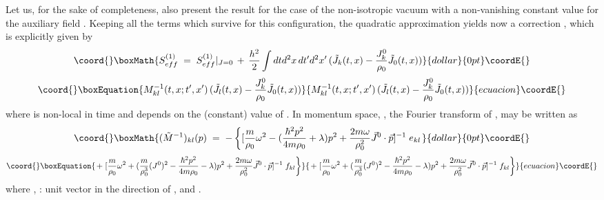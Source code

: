 \documentclass[a4paper,12pt]{article} \tolerance=200
\begin{document}
Let us, for the sake of completeness, also present the result for the
case of the non-isotropic vacuum with a non-vanishing constant value
\coordHE{} for the auxiliary field \coordHE{}. Keeping all the terms which
survive for this configuration, the quadratic approximation yields now
a correction \coordHE{}, which is explicitly given by
$$\coord{}\boxMath{
S^{(1)}_{eff}\;=\;  S^{(1)}_{eff}|_{J=0} \,+\, 
\frac{h^2}{2} \int dtd^2x \, dt'd^2x'\,
({\tilde J}_k(t,x) - \frac{J^0_k}{\rho_0} {\tilde J}_0(t,x))
}{dollar}{0pt}\coordE{}$$
\begin{equation}\coord{}\boxEquation{\label{eq:s4eff}
M^{-1}_{kl}(t,x;t',x')\,({\tilde J}_l(t,x) - \frac{J^0_k}{\rho_0} {\tilde J}_0(t,x))
}{M^{-1}_{kl}(t,x;t',x')\,({\tilde J}_l(t,x) - \frac{J^0_k}{\rho_0} {\tilde J}_0(t,x))
}{ecuacion}\coordE{}\end{equation}
where \coordHE{} is non-local in time and depends on the (constant)
value of \coordHE{}.  In momentum space, \coordHE{}, the Fourier
transform of \coordHE{}, may be written as
$$\coord{}\boxMath{
({\tilde M}^{-1})_{kl} (p) \;=\; - \left\{ [ \frac{m}{\rho_0} \omega^2 -
  (\frac{\hbar^2 p^2}{4 m \rho_0} + \lambda) p^2 + \frac {2 m \omega}{\rho_0^2} {\vec J}^0
  \cdot {\vec p} ]^{-1} \; e_{kl} \right.
}{dollar}{0pt}\coordE{}$$
\begin{equation}\coord{}\boxEquation{
\left. +\; [ \frac{m}{\rho_0} \omega^2 + (\frac{m}{\rho_0^3} (J^0)^2 - \frac{\hbar^2 p^2}{4 m \rho_0} - \lambda) p^2 
+ \frac {2 m \omega}{\rho_0^2} {\vec J}^0 \cdot {\vec p} ]^{-1} \; f_{kl} \right\}
}{
\left. +\; [ \frac{m}{\rho_0} \omega^2 + (\frac{m}{\rho_0^3} (J^0)^2 - \frac{\hbar^2 p^2}{4 m \rho_0} - \lambda) p^2 
+ \frac {2 m \omega}{\rho_0^2} {\vec J}^0 \cdot {\vec p} ]^{-1} \; f_{kl} \right\}
}{ecuacion}\coordE{}\end{equation}
where \coordHE{}, \coordHE{}: unit vector in the direction of \coordHE{}, and 
\coordHE{}.
\end{document}
